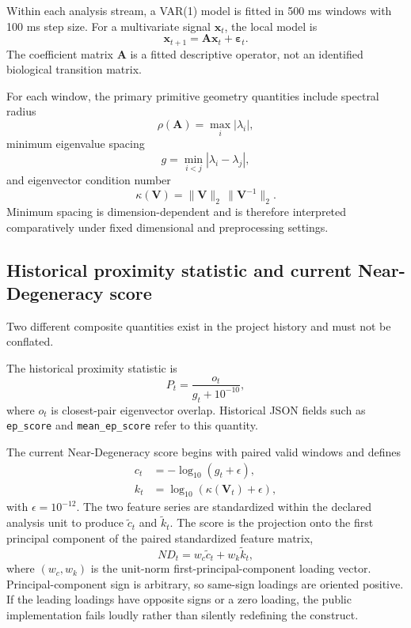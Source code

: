 \documentclass[preprint,12pt,nonatbib]{elsarticle}
\begin{document}
Within each analysis stream, a VAR(1) model is fitted in 500 ms windows with 100 ms step size. For a multivariate signal $\mathbf{x}_t$, the local model is
\begin{equation}
\mathbf{x}_{t+1} = \mathbf{A}\mathbf{x}_t + \boldsymbol{\varepsilon}_t.
\end{equation}
The coefficient matrix $\mathbf{A}$ is a fitted descriptive operator, not an identified biological transition matrix.

For each window, the primary primitive geometry quantities include spectral radius
\begin{equation}
\rho(\mathbf{A}) = \max_i |\lambda_i|,
\end{equation}
minimum eigenvalue spacing
\begin{equation}
g = \min_{i<j}|\lambda_i-\lambda_j|,
\end{equation}
and eigenvector condition number
\begin{equation}
\kappa(\mathbf{V}) = \|\mathbf{V}\|_2\,\|\mathbf{V}^{-1}\|_2.
\end{equation}
Minimum spacing is dimension-dependent and is therefore interpreted comparatively under fixed dimensional and preprocessing settings.

\subsection{Historical proximity statistic and current Near-Degeneracy score}
Two different composite quantities exist in the project history and must not be conflated.

The historical proximity statistic is
\begin{equation}
P_t = \frac{o_t}{g_t + 10^{-10}},
\end{equation}
where $o_t$ is closest-pair eigenvector overlap. Historical JSON fields such as \texttt{ep\_score} and \texttt{mean\_ep\_score} refer to this quantity.

The current Near-Degeneracy score begins with paired valid windows and defines
\begin{align}
c_t &= -\log_{10}(g_t+\epsilon),\\
k_t &= \log_{10}(\kappa(\mathbf{V}_t)+\epsilon),
\end{align}
with $\epsilon=10^{-12}$. The two feature series are standardized within the declared analysis unit to produce $\tilde c_t$ and $\tilde k_t$. The score is the projection onto the first principal component of the paired standardized feature matrix,
\begin{equation}
ND_t = w_c\tilde c_t + w_k\tilde k_t,
\end{equation}
where $(w_c,w_k)$ is the unit-norm first-principal-component loading vector. Principal-component sign is arbitrary, so same-sign loadings are oriented positive. If the leading loadings have opposite signs or a zero loading, the public implementation fails loudly rather than silently redefining the construct.
\end{document}
